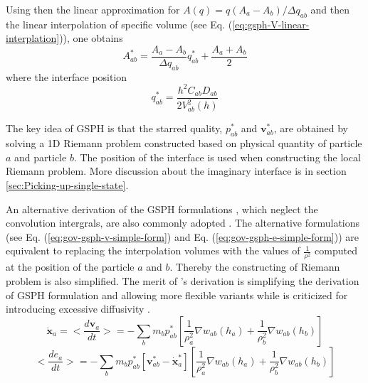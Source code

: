 Using then the linear approximation for $A(q) = q(A_a - A_b)/ \Delta q_{ab}$ and then the linear interpolation of specific volume (see Eq. (\ref{eq:gsph-V-linear-interplation})), one obtains 
\begin{equation}
A_{ab}^{\ast} = \frac{A_a - A_b}{\Delta q_{ab}} q_{ab}^{\ast} + \frac{A_a + A_b}{2}
\label{eq:GSPH-f-interpolation-evaluation}
\end{equation}
where the interface position 
\begin{equation}
q_{ab}^{\ast} = \frac{h^2 C_{ab} D_{ab}}{2V_{ab}^2(h)}
\label{eq:GSPH-f-interpolation-evaluation}
\end{equation}

The key idea of GSPH is that the starred quality, $p_{a b}^{\ast}$ and $\textbf{v}_{a b}^{\ast}$, are obtained by solving a 1D Riemann problem constructed based on physical quantity of particle $a$ and particle $b$. The position of the interface is used when constructing the local Riemann problem.
More discussion about the imaginary interface is in section \ref{sec:Picking-up-single-state}.

An alternative derivation of the GSPH formulations \citep{cha2003implementations}, which neglect the convolution intergrals, are also commonly adopted \citep[e.g.][]{puri2014approximate}. The alternative formulations (see Eq. (\ref{eq:gov-gsph-v-simple-form}) and Eq. (\ref{eq:gov-gsph-e-simple-form})) are equivalent to replacing the interpolation volumes with the values of $\frac{1}{\rho^2}$ computed at the position of the particle $a$ and $b$. Thereby the constructing of Riemann problem is also simplified. The merit of \citet{cha2003implementations}'s derivation is simplifying the derivation of GSPH formulation and allowing more flexible variants while is criticized for introducing excessive diffusivity \citep{borgani2012hydrodynamic}.  
\begin{equation}
\ddot{\textbf{x}}_{a} = <\dfrac{d \textbf{v}_{a}}{dt}>= -\sum_{b} m_{b} p_{a b}^{\ast} \left[\frac{1}{\rho_{a}^2} \nabla w_{a b}(h_{a}) + \frac{1}{\rho_{b}^2} \nabla w_{a b}(h_{b}) \right]
\label{eq:gov-gsph-v-simple-form}
\end{equation}
\begin{equation}
<\dfrac{d e_{a}}{dt}>= - \sum_{b} m_{b} p_{a b}^{\ast} [\textbf{v}_{a b}^{\ast} - \dot{\textbf{x}}_{a}^{\ast}] \left[\frac{1}{\rho_{a}^2} \nabla w_{a b}(h_{a}) + \frac{1}{\rho_{b}^2} \nabla w_{a b}(h_{b}) \right]
\label{eq:gov-gsph-e-simple-form}
\end{equation}

